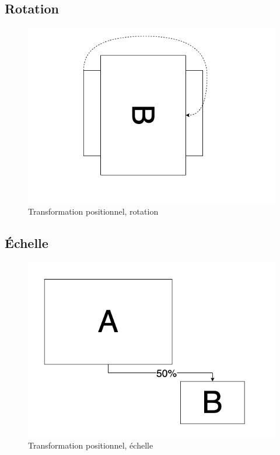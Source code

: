 \documentclass[
  french,
]{book}
\begin{document}
\hypertarget{rotation}{%
\subsection{Rotation}\label{rotation}}

\begin{figure}
\centering
\includegraphics{medias/traiter/figures/dia_transfogeo_rotation.png}
\caption{Transformation positionnel, rotation}
\end{figure}

\hypertarget{uxe9chelle}{%
\subsection{Échelle}\label{uxe9chelle}}

\begin{figure}
\centering
\includegraphics{medias/traiter/figures/dia_transfogeo_echelle.png}
\caption{Transformation positionnel, échelle}
\end{figure}
\end{document}
